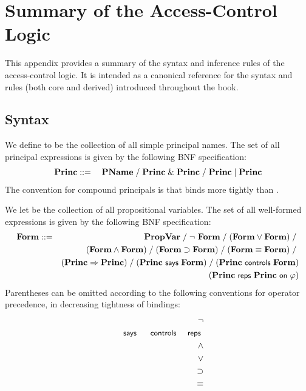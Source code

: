 \chapter{Summary of the Access-Control Logic}
\label{cha:logic-summary}

This appendix provides a summary of the syntax and inference
rules of the access-control logic.  It is intended as a canonical
reference for the syntax and rules (both core and derived) introduced
throughout the book.

\section{Syntax}
We define \PName to be the collection of all simple principal names.
The set \PExp of all principal expressions is given by the following BNF
specification:
\begin{eqnarray*}
  \textbf{Princ} &\; {:}{:}{=} \;& \textbf{PName} \;/\;  \textbf{Princ} \;\&\; \textbf{Princ} \;/\; \textbf{Princ} \;|\; \textbf{Princ}
\end{eqnarray*}
The convention for compound principals is that \with binds more tightly
than \quoting.

We let \PropVar be the collection of all propositional
variables.  The set \LExp of all well-formed expressions is given by
the following BNF specification:
\begin{eqnarray*}
  \textbf{Form} &::=&  \textbf{PropVar} \;/\;
               \neg\ \textbf{Form} \;/\;
               (\textbf{Form} \vee \textbf{Form}) \;/\; \\
               & & 
               (\textbf{Form} \wedge \textbf{Form}) \;/\; 
               (\textbf{Form} \supset \textbf{Form}) \;/\; 
               (\textbf{Form} \equiv \textbf{Form}) \;/\; \\
               & & 
               (\textbf{Princ} \Rightarrow \textbf{Princ}) \;/\;
               (\textbf{Princ} \text{\small\textsf{ says }} \textbf{Form}) \;/\;
               (\textbf{Princ} \text{\small\textsf{ controls }} \textbf{Form}) \\
               & & 
               ({\textbf{Princ}} \text{\small\textsf{ reps }}{\ensuremath{\textbf{Princ}}}{\text{\small\textsf{ on }}}{\varphi}) 
\end{eqnarray*}
Parentheses can be omitted according to the following conventions for
operator precedence, in decreasing tightness of bindings:
\begin{eqnarray*}
  & & \neg \\
  & & \text{\small\textsf{ says }} \quad \text{\small\textsf{ controls }} \quad \text{\small\textsf{reps} } \\
  & & \wedge \\
  & & \vee \\
  & & \supset \\
  & & \equiv \\
  & & 
\end{eqnarray*}

